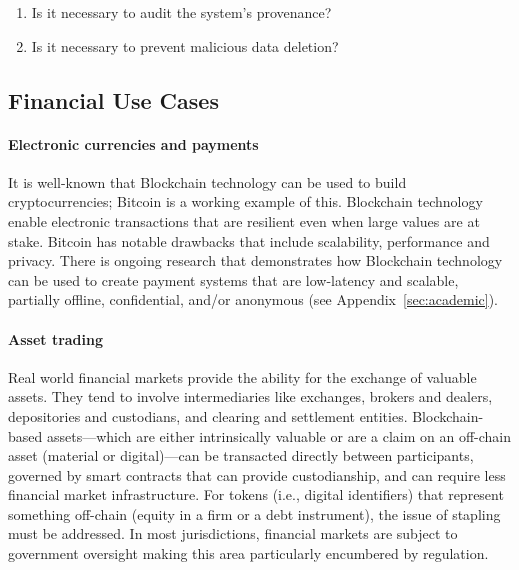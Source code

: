 \begin{enumerate}[start=3]
	\item Is it necessary to audit the system's provenance?
	\item Is it necessary to prevent malicious data deletion?
\end{enumerate}




\subsection{Financial Use Cases}

\paragraph{Electronic currencies and payments}


It is well-known that Blockchain technology can be used to build cryptocurrencies; Bitcoin is a working example of this.
Blockchain technology enable electronic transactions that are resilient even when large values are at stake.
Bitcoin has notable drawbacks that include scalability, performance and privacy.
There is ongoing research that demonstrates how Blockchain technology can be used to create payment systems that are low-latency and scalable, partially offline, confidential, and/or anonymous (see Appendix~\ref{sec:academic}).

\paragraph{Asset trading}

Real world financial markets provide the ability for the exchange of valuable assets. 
They tend to involve intermediaries like exchanges, brokers and dealers, depositories and custodians, and clearing and settlement entities. 
Blockchain-based assets---which are either intrinsically valuable or are a claim on an off-chain asset (material or digital)---can be transacted directly between participants, governed by smart contracts that can provide custodianship, and can require less financial market infrastructure.
For tokens (i.e., digital identifiers) that represent something off-chain (\ie equity in a firm or a debt instrument), the issue of stapling must be addressed.
In most jurisdictions, financial markets are subject to government oversight making this area particularly encumbered by regulation.

